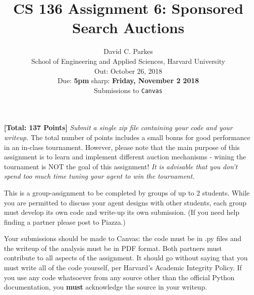 \documentclass[11pt]{article}
\newcommand{\points}[1]{\textbf{[#1 Points]}}
\begin{document}
\title{CS 136 Assignment 6: Sponsored Search Auctions}
	\author{David C. Parkes  \\
	School of Engineering and Applied Sciences, Harvard University \\
	Out: October 26, 2018\\
	Due: {\bf 5pm} sharp: {\bf Friday, November 2 2018}\\
	Submissions to {\tt Canvas}}
\date{}

\maketitle

\noindent \points{Total: 137} {\em Submit a single zip file containing
  your code and your writeup.} The total number of points includes a
small bonus for good performance in an in-class tournament. However, please note that the main purpose of this assignment is to learn and implement different auction mechanisms - wining the tournament is NOT the goal of this assignment! \textit {It is advisable that you don't spend too much time tuning your agent to win the tournament.} 

This is a group-assignment to be completed by groups of
up to 2 students. While you are permitted to discuss your agent
designs with other students, each group must develop its own code and
write-up its own submission. (If you need help finding a partner
please post to Piazza.)

Your submissions should be made to Canvas: the code must be in .py files and the writeup of the
analysis must be in PDF format. Both partners must contribute to all aspects of the assignment.
It should go without saying that you must write all of the code yourself, per Harvard's Academic
Integrity Policy. If you use any code whatsoever from any source other than the official Python
documentation, you \textbf{must} acknowledge the source in your writeup.
\end{document}
